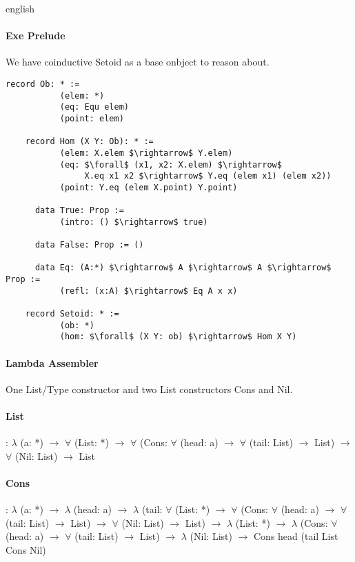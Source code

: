 \documentclass{abstract}
\begin{document}
\begin{theses}{english}
\paragraph{Exe Prelude}

We have coinductive Setoid as a base onbject to reason about.

\begin{lstlisting}[mathescape=true]
    record Ob: * :=
           (elem: *)
           (eq: Equ elem)
           (point: elem)

    record Hom (X Y: Ob): * :=
           (elem: X.elem $\rightarrow$ Y.elem)
           (eq: $\forall$ (x1, x2: X.elem) $\rightarrow$ 
                X.eq x1 x2 $\rightarrow$ Y.eq (elem x1) (elem x2))
           (point: Y.eq (elem X.point) Y.point)

      data True: Prop :=
           (intro: () $\rightarrow$ true)

      data False: Prop := ()

      data Eq: (A:*) $\rightarrow$ A $\rightarrow$ A $\rightarrow$ Prop :=
           (refl: (x:A) $\rightarrow$ Eq A x x)

    record Setoid: * :=
           (ob: *)
           (hom: $\forall$ (X Y: ob) $\rightarrow$ Hom X Y)
\end{lstlisting}

\newpage
\paragraph{Lambda Assembler}

One List/Type constructor and two List constructors Cons and Nil.


\paragraph{List}: $\lambda$ (a: *)
$\rightarrow$ $\forall$ (List: *)
$\rightarrow$ $\forall$ (Cons:
    $\forall$ (head: a)
  $\rightarrow$ $\forall$ (tail: List)
  $\rightarrow$ List)
$\rightarrow$ $\forall$ (Nil: List)
$\rightarrow$ List\\

\paragraph{Cons}: $\lambda$ (a: *)
$\rightarrow$ $\lambda$ (head: a)
$\rightarrow$ $\lambda$ (tail:
    $\forall$ (List: *)
  $\rightarrow$ $\forall$ (Cons:
      $\forall$ (head: a)
    $\rightarrow$ $\forall$ (tail: List)
    $\rightarrow$ List)
  $\rightarrow$ $\forall$ (Nil: List)
  $\rightarrow$ List)
$\rightarrow$ $\lambda$ (List: *)
$\rightarrow$ $\lambda$ (Cons:
    $\forall$ (head: a)
  $\rightarrow$ $\forall$ (tail: List)
  $\rightarrow$ List)
$\rightarrow$ $\lambda$ (Nil: List)
$\rightarrow$ Cons head (tail List Cons Nil)\\


\end{theses}
\end{document}
